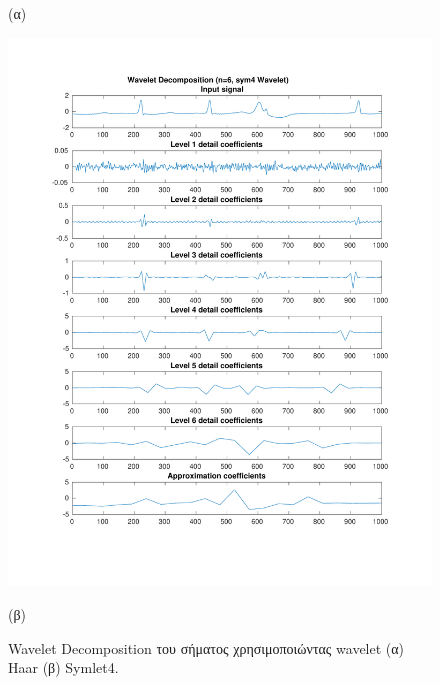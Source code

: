 \documentclass[11pt,a4paper]{article}
\begin{document}
\begin{figure}[H]
\begin{minipage}{0.48\textwidth}
	(α)
\end{minipage}
\begin{minipage}{0.48\textwidth}
	\centering
	\includegraphics[width=\textwidth]{fig/221l1_dwt2.pdf}
	
	(β)
\end{minipage}
\vfill
\caption{Wavelet Decomposition του σήματος χρησιμοποιώντας wavelet (α) Haar (β) Symlet4.}
\label{fig:221l1_dwt}
\end{figure}
\end{document}
